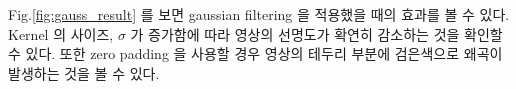 \documentclass[a4paper, 12p]{paper}
\begin{document}
Fig.\ref{fig:gauss_result} 를 보면 gaussian filtering 을 적용했을 때의 효과를 볼 수 있다. Kernel 의 사이즈, $\sigma$ 가 증가함에 따라 영상의 선명도가 확연히 감소하는 것을 확인할 수 있다. 또한 zero padding 을 사용할 경우 영상의 테두리 부분에 검은색으로 왜곡이 발생하는 것을 볼 수 있다.

\begin{figure}[H]
\centering
{}
\end{figure}
\end{document}
